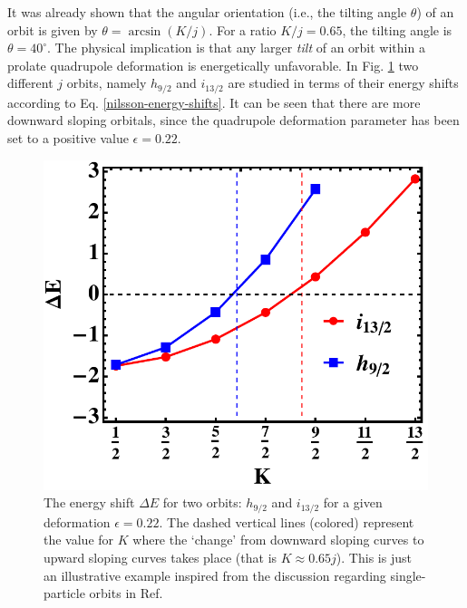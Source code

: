 It was already shown that the angular orientation (i.e., the tilting angle $\theta$) of an orbit is given by $\theta=\arcsin(K/j)$. For a ratio $K/j=0.65$, the tilting angle is $\theta=40^\circ$. The physical implication is that any larger \emph{tilt} of an orbit within a prolate quadrupole deformation is energetically unfavorable. In Fig. \ref{fig-nilsson-delta-E-shift} two different $j$ orbits, namely $h_{9/2}$ and $i_{13/2}$ are studied in terms of their energy shifts according to Eq. \ref{nilsson-energy-shifts}. It can be seen that there are more downward sloping orbitals, since the quadrupole deformation parameter has been set to a positive value $\epsilon=0.22$.
\begin{figure}
    \centering
    \includegraphics[scale=0.65]{Chapters/Figures/energy_shift_nilssonDeltaE.pdf}
    \caption{The energy shift $\Delta E$ for two orbits: $h_{9/2}$ and $i_{13/2}$ for a given deformation $\epsilon=0.22$. The dashed vertical lines (colored) represent the value for $K$ where the `change' from downward sloping curves to upward sloping curves takes place (that is $K\approx 0.65j$). This is just an illustrative example inspired from the discussion regarding single-particle orbits in Ref. \cite{casten2000nuclear}}
    \label{fig-nilsson-delta-E-shift}
\end{figure}

